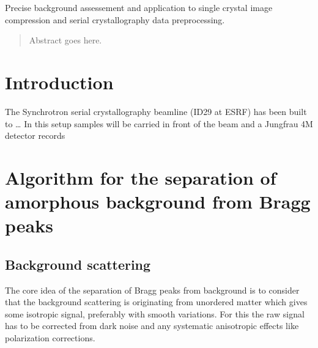 \documentclass[preprint]{iucr}              %
\begin{document}
\maketitle                        %

\begin{synopsis}
Precise background assessement and application to single crystal image compression and serial crystallography data preprocessing. 
\end{synopsis}

\begin{abstract}
Abstract goes here.
\end{abstract}



\section{Introduction}

The Synchrotron serial crystallography beamline (ID29 at ESRF) has been built to \ldots
In this setup samples will be carried in front of the beam and a Jungfrau 4M detector records 


\section{Algorithm for the separation of amorphous background from Bragg peaks}
\subsection{Background scattering}
The core idea of the separation of Bragg peaks from background is to consider that the background scattering 
is originating from unordered matter which gives some isotropic signal, preferably with smooth variations.
For this the raw signal has to be corrected from dark noise and any systematic anisotropic effects like polarization corrections.
\end{document}
